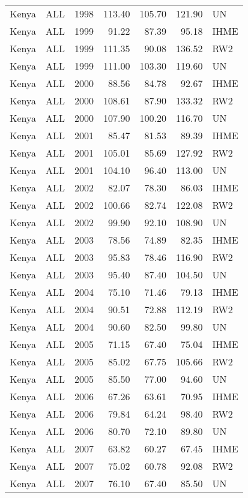 \begin{longtable}{lllrrrl}
  Kenya & ALL & 1998 & 113.40 & 105.70 & 121.90 & UN \\ 
  Kenya & ALL & 1999 & 91.22 & 87.39 & 95.18 & IHME \\ 
  Kenya & ALL & 1999 & 111.35 & 90.08 & 136.52 & RW2 \\ 
  Kenya & ALL & 1999 & 111.00 & 103.30 & 119.60 & UN \\ 
  Kenya & ALL & 2000 & 88.56 & 84.78 & 92.67 & IHME \\ 
  Kenya & ALL & 2000 & 108.61 & 87.90 & 133.32 & RW2 \\ 
  Kenya & ALL & 2000 & 107.90 & 100.20 & 116.70 & UN \\ 
  Kenya & ALL & 2001 & 85.47 & 81.53 & 89.39 & IHME \\ 
  Kenya & ALL & 2001 & 105.01 & 85.69 & 127.92 & RW2 \\ 
  Kenya & ALL & 2001 & 104.10 & 96.40 & 113.00 & UN \\ 
  Kenya & ALL & 2002 & 82.07 & 78.30 & 86.03 & IHME \\ 
  Kenya & ALL & 2002 & 100.66 & 82.74 & 122.08 & RW2 \\ 
  Kenya & ALL & 2002 & 99.90 & 92.10 & 108.90 & UN \\ 
  Kenya & ALL & 2003 & 78.56 & 74.89 & 82.35 & IHME \\ 
  Kenya & ALL & 2003 & 95.83 & 78.46 & 116.90 & RW2 \\ 
  Kenya & ALL & 2003 & 95.40 & 87.40 & 104.50 & UN \\ 
  Kenya & ALL & 2004 & 75.10 & 71.46 & 79.13 & IHME \\ 
  Kenya & ALL & 2004 & 90.51 & 72.88 & 112.19 & RW2 \\ 
  Kenya & ALL & 2004 & 90.60 & 82.50 & 99.80 & UN \\ 
  Kenya & ALL & 2005 & 71.15 & 67.40 & 75.04 & IHME \\ 
  Kenya & ALL & 2005 & 85.02 & 67.75 & 105.66 & RW2 \\ 
  Kenya & ALL & 2005 & 85.50 & 77.00 & 94.60 & UN \\ 
  Kenya & ALL & 2006 & 67.26 & 63.61 & 70.95 & IHME \\ 
  Kenya & ALL & 2006 & 79.84 & 64.24 & 98.40 & RW2 \\ 
  Kenya & ALL & 2006 & 80.70 & 72.10 & 89.80 & UN \\ 
  Kenya & ALL & 2007 & 63.82 & 60.27 & 67.45 & IHME \\ 
  Kenya & ALL & 2007 & 75.02 & 60.78 & 92.08 & RW2 \\ 
  Kenya & ALL & 2007 & 76.10 & 67.40 & 85.50 & UN \\ 

\end{longtable}
